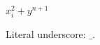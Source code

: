 \documentclass{article}
\begin{document}
$x_i^2 + y^{n+1}$

Literal underscore: $\text{\_}$.
\end{document}
